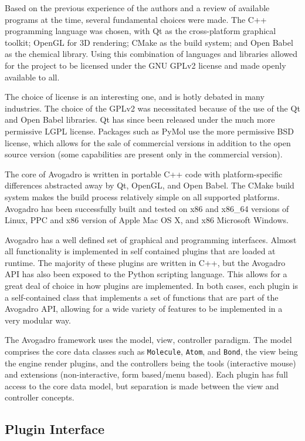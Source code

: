 \documentclass[10pt]{bmc_article}
\newenvironment{bmcformat}{\begin{raggedright}
\baselineskip20pt\sloppy\setboolean{publ}{false}}{\end{raggedright}
\baselineskip20pt\sloppy}
\begin{document}
\begin{bmcformat}
Based on the previous experience of the authors and a review of available
programs at the time, several fundamental choices were made. The C++ programming
language was chosen, with Qt as the cross-platform graphical toolkit; OpenGL for
3D rendering; CMake as the build system; and Open Babel as the chemical library.
Using this combination of languages and libraries allowed for the project to be
licensed under the GNU GPLv2 license and made openly available to all.

The choice of license is an interesting one, and is hotly debated in many
industries. The choice of the GPLv2 was necessitated because of the use of the
Qt and Open Babel libraries. Qt has since been released under the much more
permissive LGPL license. Packages such as PyMol use the more permissive BSD
license, which allows for the sale of commercial versions in addition to the open
source version (some capabilities are present only in the commercial version).

The core of Avogadro is written in portable C++ code with platform-specific
differences abstracted away by Qt, OpenGL, and Open Babel. The CMake build system
makes the build process relatively simple on all supported platforms. Avogadro
has been successfully built and tested on x86 and x86\_64 versions of Linux, PPC
and x86 version of Apple Mac OS X, and x86 Microsoft Windows.

Avogadro has a well defined set of graphical and programming interfaces. Almost
all functionality is implemented in self contained plugins that are loaded at
runtime. The majority of these plugins are written in C++, but the Avogadro API
has also been exposed to the Python scripting language. This allows for a great
deal of choice in how plugins are implemented. In both cases, each plugin is a
self-contained class that implements a set of functions that are part of the
Avogadro API, allowing for a wide variety of features to be implemented in a
very modular way.

The Avogadro framework uses the model, view, controller paradigm. The model
comprises the core data classes such as {\tt Molecule}, {\tt Atom}, and
{\tt Bond}, the view being the engine render plugins, and the
controllers being the tools (interactive mouse) and extensions
(non-interactive, form based/menu based). Each plugin has full access
to the core data model, but separation is made between the view and
controller concepts.

\subsection{Plugin Interface}


\end{bmcformat}
\end{document}
